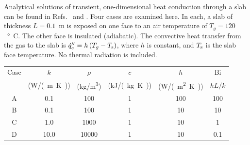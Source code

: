 \documentclass[11pt]{book}
\begin{document}
Analytical solutions of transient, one-dimensional heat conduction through a slab can be found in Refs.~\cite{Drysdale:1} and \cite{Carslaw:1}. Four
cases are examined here. In each, a slab of thickness $L=0.1$~m is exposed on one face to an air temperature of $T_g=120$~\si{\degree C}. The other face
is insulated (adiabatic). The convective heat transfer from the gas to the slab is $\dot{q}_c'' = h \, (T_g - T_{\rm s})$, where $h$ is constant, and $T_{\rm s}$ is
the slab face temperature. No thermal radiation is included.
\begin{center}
\begin{tabular}{|c|c|c|c|c|c|}
\hline
Case  &  $k$      & $\rho$       &  $c$          &   $h$         &  Bi     \\
      & (\si{W/(m.K)})  & (\si{kg/m^3})   &  (\si{kJ/(kg.K)})    &  (\si{W/(m^2.K)})  &  $hL/k$ \\ \hline \hline
A     &   0.1     & 100          &  1            &  100          &  100    \\ \hline
B     &   0.1     & 100          &  1            &  10           &  10     \\ \hline
C     &   1.0     & 1000         &  1            &  10           &  1      \\ \hline
D     &  10.0     & 10000        &  1            &  10           & 0.1     \\ \hline
\end{tabular}
\end{center}
\end{document}
